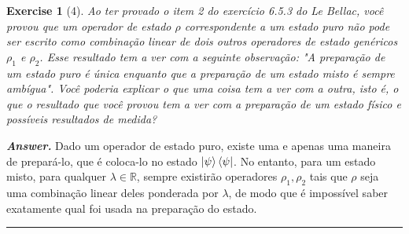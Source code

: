 \documentclass[12pt]{article}
\newtheorem{exercise}{Exercise}
\newenvironment{answer}{\noindent\textbf{\textit{Answer.}} \normalfont }{\par\noindent\rule{\textwidth}{0.4pt}}
\begin{document}
	\begin{exercise}[4]
		Ao ter provado o item 2 do exercício 6.5.3 do Le Bellac, você provou
		que um operador de estado $\rho$ correspondente a um estado puro não pode ser
		escrito como combinação linear de dois outros operadores de estado genéricos $\rho_1$ e $\rho_2$. Esse resultado tem a ver com a seguinte observação: "A preparação de um estado	puro é única enquanto que a preparação de um estado misto é sempre ambígua". Você poderia explicar o que uma coisa tem a ver com a outra, isto é, o que o resultado que você provou tem a ver com a preparação de um estado físico e
		possíveis resultados de medida?
	\end{exercise}
	\begin{answer}
		Dado um operador de estado puro, existe uma e apenas uma maneira de prepará-lo, que é coloca-lo no estado $\ket{\psi}\bra{\psi}$. No entanto, para um estado misto, para qualquer $\lambda\in\mathbb{R}$, sempre existirão operadores $\rho_1, \rho_2$ tais que $\rho$ seja uma combinação linear deles ponderada por $\lambda$, de modo que é impossível saber exatamente qual foi usada na preparação do estado. 
	\end{answer}
\end{document}
